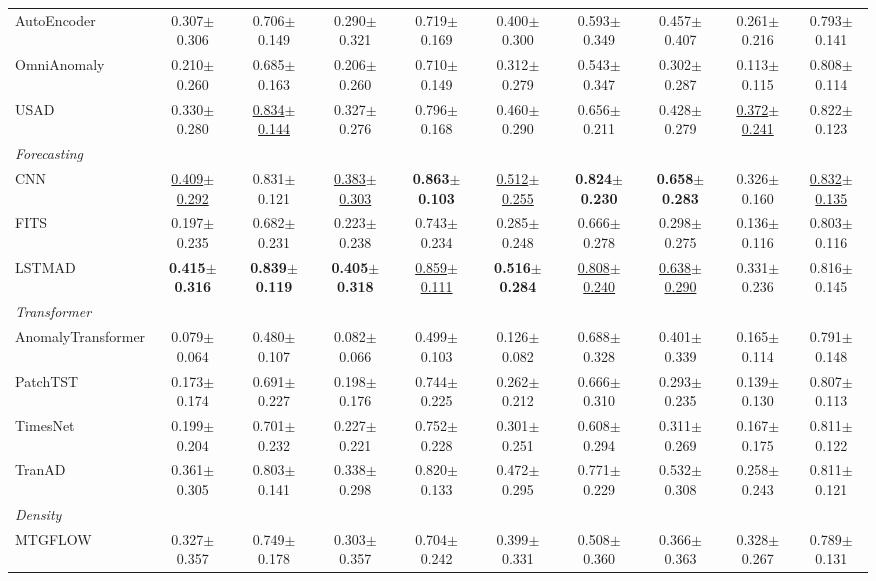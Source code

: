 \begin{table}[t]
\begin{tabular}{lccccccccc}
AutoEncoder & 0.307$\pm$0.306 & 0.706$\pm$0.149 & 0.290$\pm$0.321 & 0.719$\pm$0.169 & 0.400$\pm$0.300 & 0.593$\pm$0.349 & 0.457$\pm$0.407 & 0.261$\pm$0.216 & 0.793$\pm$0.141 \\
OmniAnomaly & 0.210$\pm$0.260 & 0.685$\pm$0.163 & 0.206$\pm$0.260 & 0.710$\pm$0.149 & 0.312$\pm$0.279 & 0.543$\pm$0.347 & 0.302$\pm$0.287 & 0.113$\pm$0.115 & 0.808$\pm$0.114 \\
USAD & 0.330$\pm$0.280 & \underline{0.834$\pm$0.144} & 0.327$\pm$0.276 & 0.796$\pm$0.168 & 0.460$\pm$0.290 & 0.656$\pm$0.211 & 0.428$\pm$0.279 & \underline{0.372$\pm$0.241} & 0.822$\pm$0.123 \\
\midrule
\multicolumn{10}{l}{\textit{Forecasting}} \\
CNN & \underline{0.409$\pm$0.292} & 0.831$\pm$0.121 & \underline{0.383$\pm$0.303} & \textbf{0.863$\pm$0.103} & \underline{0.512$\pm$0.255} & \textbf{0.824$\pm$0.230} & \textbf{0.658$\pm$0.283} & 0.326$\pm$0.160 & \underline{0.832$\pm$0.135} \\
FITS & 0.197$\pm$0.235 & 0.682$\pm$0.231 & 0.223$\pm$0.238 & 0.743$\pm$0.234 & 0.285$\pm$0.248 & 0.666$\pm$0.278 & 0.298$\pm$0.275 & 0.136$\pm$0.116 & 0.803$\pm$0.116 \\
LSTMAD & \textbf{0.415$\pm$0.316} & \textbf{0.839$\pm$0.119} & \textbf{0.405$\pm$0.318} & \underline{0.859$\pm$0.111} & \textbf{0.516$\pm$0.284} & \underline{0.808$\pm$0.240} & \underline{0.638$\pm$0.290} & 0.331$\pm$0.236 & 0.816$\pm$0.145 \\
\midrule
\multicolumn{10}{l}{\textit{Transformer}} \\
AnomalyTransformer & 0.079$\pm$0.064 & 0.480$\pm$0.107 & 0.082$\pm$0.066 & 0.499$\pm$0.103 & 0.126$\pm$0.082 & 0.688$\pm$0.328 & 0.401$\pm$0.339 & 0.165$\pm$0.114 & 0.791$\pm$0.148 \\
PatchTST & 0.173$\pm$0.174 & 0.691$\pm$0.227 & 0.198$\pm$0.176 & 0.744$\pm$0.225 & 0.262$\pm$0.212 & 0.666$\pm$0.310 & 0.293$\pm$0.235 & 0.139$\pm$0.130 & 0.807$\pm$0.113 \\
TimesNet & 0.199$\pm$0.204 & 0.701$\pm$0.232 & 0.227$\pm$0.221 & 0.752$\pm$0.228 & 0.301$\pm$0.251 & 0.608$\pm$0.294 & 0.311$\pm$0.269 & 0.167$\pm$0.175 & 0.811$\pm$0.122 \\
TranAD & 0.361$\pm$0.305 & 0.803$\pm$0.141 & 0.338$\pm$0.298 & 0.820$\pm$0.133 & 0.472$\pm$0.295 & 0.771$\pm$0.229 & 0.532$\pm$0.308 & 0.258$\pm$0.243 & 0.811$\pm$0.121 \\
\midrule
\multicolumn{10}{l}{\textit{Density}} \\
MTGFLOW & 0.327$\pm$0.357 & 0.749$\pm$0.178 & 0.303$\pm$0.357 & 0.704$\pm$0.242 & 0.399$\pm$0.331 & 0.508$\pm$0.360 & 0.366$\pm$0.363 & 0.328$\pm$0.267 & 0.789$\pm$0.131 \\

\end{tabular}
\end{table}
